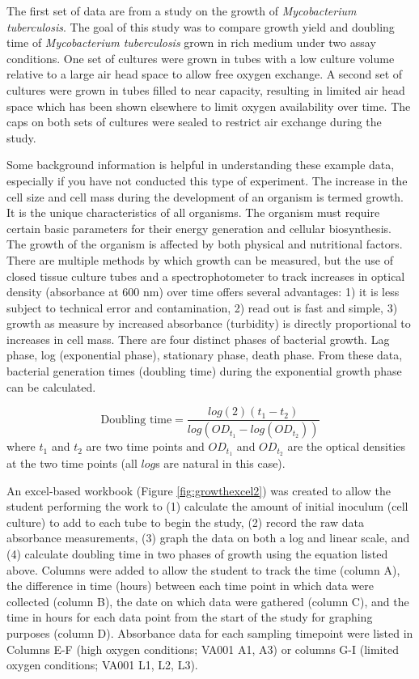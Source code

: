 \documentclass[]{tufte-book}
\begin{document}
The first set of data are from a study on the growth of \emph{Mycobacterium
tuberculosis}. The goal of this study was to compare growth yield and doubling
time of \emph{Mycobacterium tuberculosis} grown in rich medium under two assay
conditions. One set of cultures were grown in tubes with a low culture volume
relative to a large air head space to allow free oxygen exchange. A second set
of cultures were grown in tubes filled to near capacity, resulting in limited
air head space which has been shown elsewhere to limit oxygen availability over
time. The caps on both sets of cultures were sealed to restrict air exchange
during the study.

Some background information is helpful in understanding these example data,
especially if you have not conducted this type of experiment. The increase in
the cell size and cell mass during the development of an organism is termed
growth. It is the unique characteristics of all organisms. The organism must
require certain basic parameters for their energy generation and cellular
biosynthesis. The growth of the organism is affected by both physical and
nutritional factors. There are multiple methods by which growth can be measured,
but the use of closed tissue culture tubes and a spectrophotometer to track
increases in optical density (absorbance at 600 nm) over time offers several
advantages: 1) it is less subject to technical error and contamination, 2) read
out is fast and simple, 3) growth as measure by increased absorbance (turbidity)
is directly proportional to increases in cell mass. There are four distinct
phases of bacterial growth. Lag phase, log (exponential phase), stationary
phase, death phase. From these data, bacterial generation times (doubling time)
during the exponential growth phase can be calculated.

\[
\mbox{Doubling time} = \frac{log(2)(t_1 - t_2)}{log(OD_{t_1} - log(OD_{t_2}))}
\]
where \(t_1\) and \(t_2\) are two time points and \(OD_{t_1}\) and \(OD_{t_2}\) are the
optical densities at the two time points (all \(log\)s are natural in this case).

An excel-based workbook (Figure \ref{fig:growthexcel2}) was created to allow the
student performing the work to (1) calculate the amount of initial inoculum
(cell culture) to add to each tube to begin the study, (2) record the raw data
absorbance measurements, (3) graph the data on both a log and linear scale, and
(4) calculate doubling time in two phases of growth using the equation listed
above. Columns were added to allow the student to track the time (column A), the
difference in time (hours) between each time point in which data were collected
(column B), the date on which data were gathered (column C), and the time in
hours for each data point from the start of the study for graphing purposes
(column D). Absorbance data for each sampling timepoint were listed in Columns
E-F (high oxygen conditions; VA001 A1, A3) or columns G-I (limited oxygen
conditions; VA001 L1, L2, L3).
\end{document}
